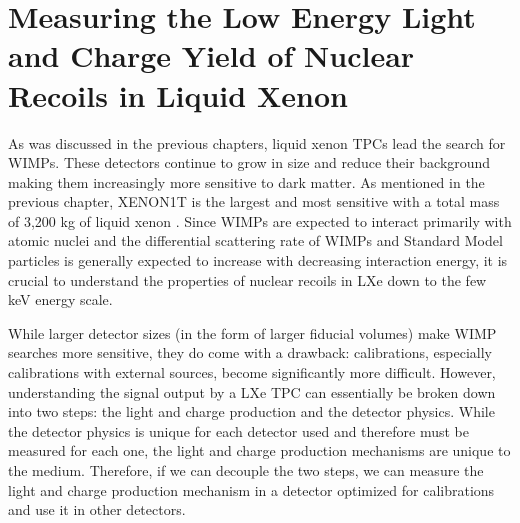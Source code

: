 

\pagestyle{cu}
\graphicspath{{./Chapter4/images/}}

\chapter[Measuring the Low Energy Light and Charge Yield of Nuclear Recoils in Liquid Xenon][Measuring the Low Energy Light and Charge Yield of Nuclear Recoils in Liquid Xenon]{Measuring the Low Energy Light and Charge Yield of Nuclear Recoils in Liquid Xenon}
\label{chap:nerix}


As was discussed in the previous chapters, liquid xenon TPCs lead the search for WIMPs.  These detectors continue to grow in size and reduce their background making them increasingly more sensitive to dark matter.  As mentioned in the previous chapter, XENON1T is the largest and most sensitive with a total mass of 3,200 kg of liquid xenon \cite{aprile2017first}.  Since WIMPs are expected to interact primarily with atomic nuclei and the differential scattering rate of WIMPs and Standard Model particles is generally expected to increase with decreasing interaction energy, it is crucial to understand the properties of nuclear recoils in LXe down to the few keV energy scale.  

While larger detector sizes (in the form of larger fiducial volumes) make WIMP searches more sensitive, they do come with a drawback: calibrations, especially calibrations with external sources, become significantly more difficult.   However, understanding the signal output by a LXe TPC can essentially be broken down into two steps: the light and charge production and the detector physics.  While the detector physics is unique for each detector used and therefore must be measured for each one, the light and charge production mechanisms are unique to the medium.  Therefore, if we can decouple the two steps, we can measure the light and charge production mechanism in a detector optimized for calibrations and use it in other detectors.  

